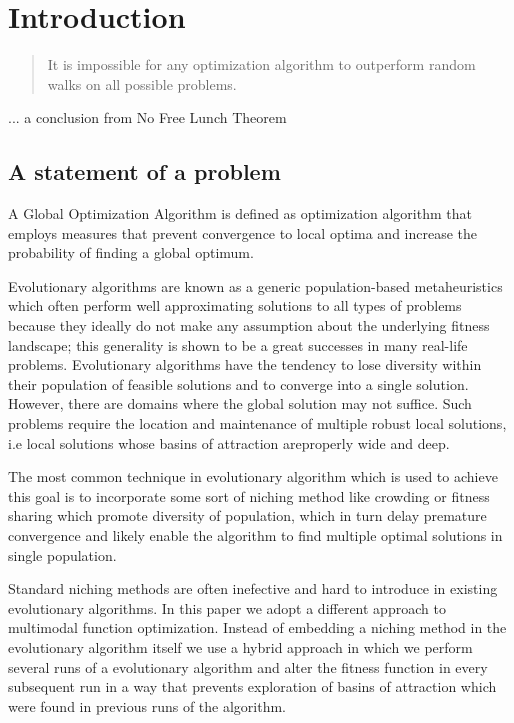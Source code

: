 
\chapter{Introduction}
\label{Introduction} 

\begin{quotation}
 It is impossible for any optimization algorithm to outperform random walks on all possible problems.
\end{quotation}
\begin{flushright}
 ... a conclusion from No Free Lunch Theorem
\end{flushright}

\section{A statement of a problem}

A Global Optimization Algorithm is defined as optimization algorithm
that employs measures that prevent convergence to local optima
and increase the probability of finding a global optimum. 

Evolutionary algorithms are known as a generic population-based metaheuristics
which often perform well approximating solutions to all
types of problems because they ideally do not make any assumption about the underlying fitness landscape; 
this generality is shown to be a great successes in many real-life problems. 
Evolutionary algorithms have the tendency to lose diversity within their
population of feasible solutions and to converge into a single solution.
However, there are domains where the global solution may not suffice. 
Such problems require the location and maintenance of multiple robust local
solutions, i.e local solutions whose basins of attraction areproperly wide and deep.

The most common technique in evolutionary algorithm which is
used to achieve this goal is to incorporate some sort of niching method
like crowding or fitness sharing which promote diversity of population,
which in turn delay premature convergence and likely enable the algorithm to
find multiple optimal solutions in single population.
 
Standard niching methods are often inefective and hard to introduce 
in existing evolutionary algorithms. In this paper we adopt a
different approach to multimodal function optimization. Instead of
embedding a niching method in the evolutionary algorithm itself we
use a hybrid approach in which we perform several runs of a evolutionary 
algorithm and alter the fitness function in every subsequent
run in a way that prevents exploration of basins of attraction which
were found in previous runs of the algorithm.

